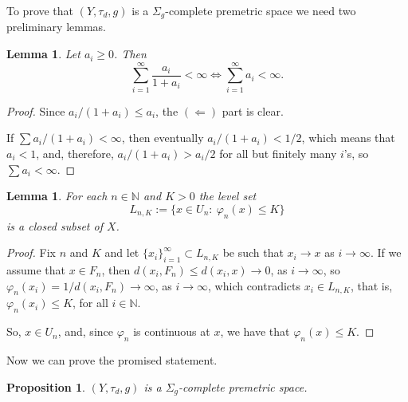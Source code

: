 \documentclass[12pt]{article}
\newtheorem{lemma}[theorem]{Lemma}
\newtheorem{proposition}[theorem]{Proposition}
\begin{document}
To prove that $(Y,\tau_d,g)$ is a $\Sigma_g$-complete premetric space we need two preliminary lemmas.

    \begin{lemma}
        \label{lem:gd}
        Let $a_i\ge 0$. Then
        $$
            \sum_{i=1}^\infty \frac{a_i}{1+a_i} < \infty \iff
            \sum_{i=1}^\infty a_i < \infty.
        $$
    \end{lemma}
    \begin{proof}
        Since $a_i/(1+a_i) \le a_i$, the $(\Leftarrow)$ part is clear.

        If $\sum a_i/(1+a_i) < \infty$, then eventually $a_i/(1+a_i) < 1/2$, which means that $a_i < 1$, and, therefore, $a_i/(1+a_i) > a_i/2$ for all but finitely many $i$'s, so $\sum a_i < \infty$.
    \end{proof}
    \begin{lemma}
        \label{lem:gd-2}
        For each $n\in\mathbb{N}$ and $K>0$ the level set
        $$
            L_{n,K} := \{x\in U_n:\ \varphi_n(x) \le K\}
        $$
        is a closed subset of $X$.
    \end{lemma}
    \begin{proof}
        Fix $n$ and $K$ and let $\{x_i\}_{i=1}^\infty\subset L_{n,K}$ be such that $x_i\to x$ as $i\to\infty$. If we assume that $x\in F_n$, then $d(x_i,F_n) \le d(x_i,x)\to0$, as $i\to\infty$, so $\varphi_n(x_i)=1/d(x_i,F_n)\to\infty$, as $i\to\infty$, which contradicts $x_i\in L_{n,K}$, that is, $\varphi_n(x_i)\le K$, for all $i\in\mathbb{N}$.

        So, $x\in U_n$, and, since $\varphi_n$ is continuous at $x$, we have that $\varphi_n(x)\le K$.
    \end{proof}

Now we can prove the promised statement.
  \begin{proposition}
        \label{pro:gd}
         $(Y,\tau_d,g)$ is a $\Sigma_g$-complete premetric space.
    \end{proposition}
\end{document}

